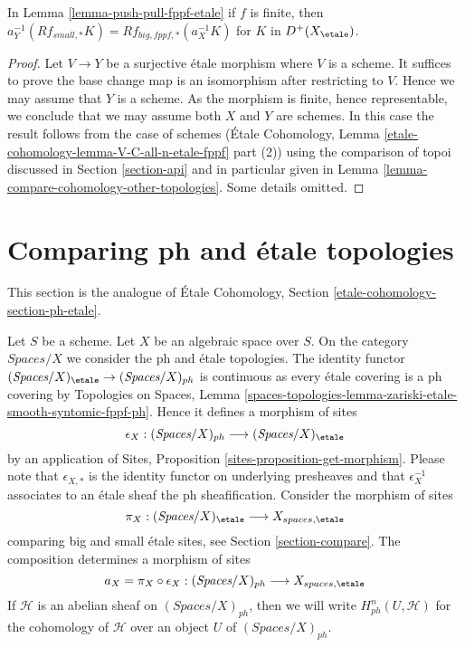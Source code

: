 \begin{lemma}
\label{lemma-finite-push-pull-fppf-etale}
In Lemma \ref{lemma-push-pull-fppf-etale} if $f$ is finite, then
$a_Y^{-1}(Rf_{small, *}K) = Rf_{big, fppf, *}(a_X^{-1}K)$
for $K$ in $D^+(X_\etale)$.
\end{lemma}

\begin{proof}
Let $V \to Y$ be a surjective \'etale morphism where $V$ is a scheme.
It suffices to prove the base change map is an isomorphism after
restricting to $V$. Hence we may assume that $Y$ is a scheme.
As the morphism is finite, hence representable, we conclude
that we may assume both $X$ and $Y$ are schemes. In this case
the result follows from the case of schemes
(\'Etale Cohomology, Lemma \ref{etale-cohomology-lemma-V-C-all-n-etale-fppf}
part (2)) using the comparison of topoi discussed in
Section \ref{section-api}
and in particular given in
Lemma \ref{lemma-compare-cohomology-other-topologies}.
Some details omitted.
\end{proof}











\section{Comparing ph and \'etale topologies}
\label{section-ph-etale}

\noindent
This section is the analogue of
\'Etale Cohomology, Section \ref{etale-cohomology-section-ph-etale}.

\medskip\noindent
Let $S$ be a scheme. Let $X$ be an algebraic space over $S$.
On the category $\textit{Spaces}/X$ we consider the ph
and \'etale topologies. The identity functor
$(\textit{Spaces}/X)_\etale \to (\textit{Spaces}/X)_{ph}$
is continuous as every \'etale covering is a ph covering by
Topologies on Spaces, Lemma
\ref{spaces-topologies-lemma-zariski-etale-smooth-syntomic-fppf-ph}.
Hence it defines a morphism of sites
$$
\epsilon_X :
(\textit{Spaces}/X)_{ph} \longrightarrow (\textit{Spaces}/X)_\etale
$$
by an application of Sites, Proposition \ref{sites-proposition-get-morphism}.
Please note that $\epsilon_{X, *}$ is the identity functor on underlying
presheaves and that $\epsilon_X^{-1}$ associates to an \'etale sheaf the
ph sheafification.
Consider the morphism of sites
$$
\pi_X : (\textit{Spaces}/X)_\etale \longrightarrow X_{spaces, \etale}
$$
comparing big and small \'etale sites, see Section \ref{section-compare}.
The composition determines a morphism of sites
$$
a_X = \pi_X \circ \epsilon_X :
(\textit{Spaces}/X)_{ph}
\longrightarrow
X_{spaces, \etale}
$$
If $\mathcal{H}$ is an abelian sheaf on $(\textit{Spaces}/X)_{ph}$,
then we will write $H^n_{ph}(U, \mathcal{H})$ for the cohomology
of $\mathcal{H}$ over an object $U$ of $(\textit{Spaces}/X)_{ph}$.


